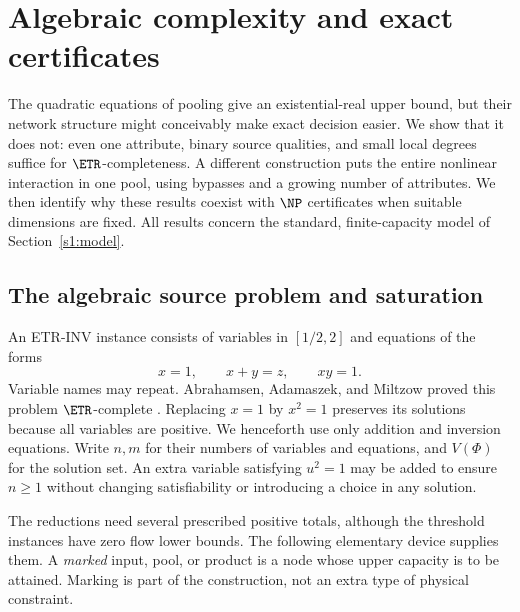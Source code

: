 \section{Algebraic complexity and exact certificates}\label{s2:algebraic}

The quadratic equations of pooling give an existential-real upper bound,
but their network structure might conceivably make exact decision easier.
We show that it does not: even one attribute, binary source qualities,
and small local degrees suffice for $\ETR$-completeness. A different
construction puts the entire nonlinear interaction in one pool, using
bypasses and a growing number of attributes. We then identify why these
results coexist with $\NP$ certificates when suitable dimensions are
fixed. All results concern the standard, finite-capacity model of
Section~\ref{s1:model}.

\subsection{The algebraic source problem and saturation}\label{s2:source}

An \textsc{ETR-INV} instance consists of variables in $[1/2,2]$ and
equations of the forms
\begin{equation}
 x=1,\qquad x+y=z,\qquad xy=1.\label{s2:etr-inv}
\end{equation}
Variable names may repeat. Abrahamsen, Adamaszek, and Miltzow proved this
problem $\ETR$-complete
\citep[Definition~5 and Theorem~7 of the arXiv version]{abrahamsen2022-the-art-gallery-problem-is}.
Replacing $x=1$ by $x^2=1$ preserves its solutions because all variables
are positive. We henceforth use only addition and inversion equations.
Write $n,m$ for their numbers of variables and equations, and $V(\Phi)$
for the solution set. An extra variable satisfying $u^2=1$ may be added
to ensure $n\ge1$ without changing satisfiability or introducing a choice
in any solution.

The reductions need several prescribed positive totals, although the
threshold instances have zero flow lower bounds. The following elementary
device supplies them. A \emph{marked} input, pool, or product is a node
whose upper capacity is to be attained. Marking is part of the construction,
not an extra type of physical constraint.


